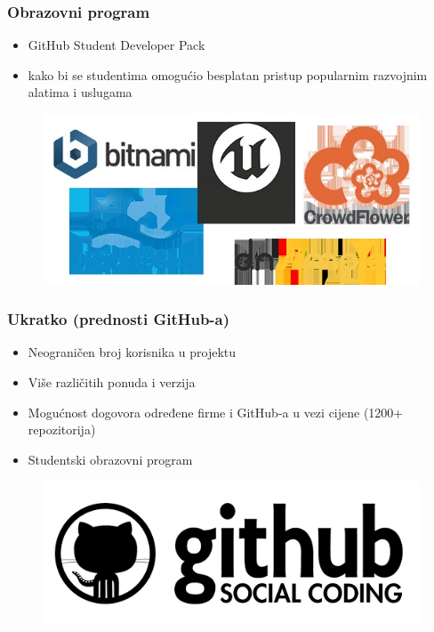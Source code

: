 \documentclass[12p, Times New Roman]{beamer}
\begin{document}
	\begin{frame}				%
		\frametitle{Obrazovni program}
		\begin{itemize}
			\item GitHub Student Developer Pack
			\item kako bi se studentima omogućio besplatan pristup popularnim razvojnim alatima i uslugama

		\end{itemize}

		\begin{figure}
			\begin{center}
				\includegraphics[scale=0.4]{logos.png}
			\end{center}
		\end{figure}


	\end{frame}



	\begin{frame}				%
		\frametitle{Ukratko (prednosti GitHub-a)}
		\begin{itemize}
			\item Neograničen broj korisnika u projektu
			\item Više različitih ponuda i verzija
			\item Mogućnost dogovora određene firme i GitHub-a u vezi cijene (1200+ repozitorija)
			\item Studentski obrazovni program

		\end{itemize}

		\begin{figure}
			\begin{center}
				\includegraphics[scale=0.5]{student.png}
			\end{center}
		\end{figure}


	\end{frame}
\end{document}
